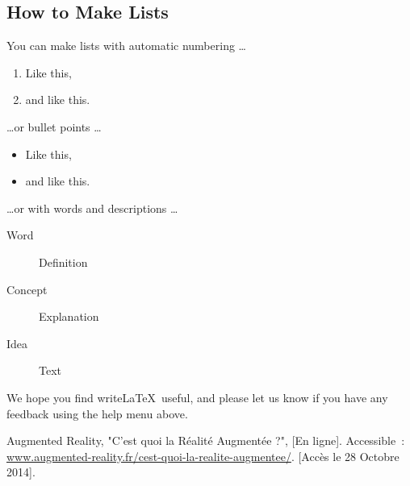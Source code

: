 \documentclass[a4paper]{article}
\begin{document}
\subsection{How to Make Lists}

You can make lists with automatic numbering \dots

\begin{enumerate}
\item Like this,
\item and like this.
\end{enumerate}
\dots or bullet points \dots
\begin{itemize}
\item Like this,
\item and like this.
\end{itemize}
\dots or with words and descriptions \dots
\begin{description}
\item[Word] Definition
\item[Concept] Explanation
\item[Idea] Text
\end{description}

We hope you find write\LaTeX\ useful, and please let us know if you have any feedback using the help menu above.


\begin{thebibliography}{1}
	 Augmented Reality, "C'est quoi la Réalité Augmentée ?", [En ligne]. Accessible~: \url{www.augmented-reality.fr/cest-quoi-la-realite-augmentee/}. [Accès le 28 Octobre 2014].
\end{thebibliography}

\end{document}
